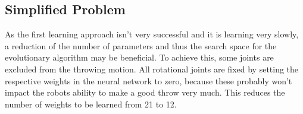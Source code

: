 \subsection{Simplified Problem}
As the first learning approach isn't very successful and it is learning very slowly, a reduction of the number of parameters and thus the search space for the evolutionary algorithm may be beneficial.
To achieve this, some joints are excluded from the throwing motion.
All rotational joints are fixed by setting the respective weights in the neural network to zero, because these probably won't impact the robots ability to make a good throw very much.
This reduces the number of weights to be learned from 21 to 12.